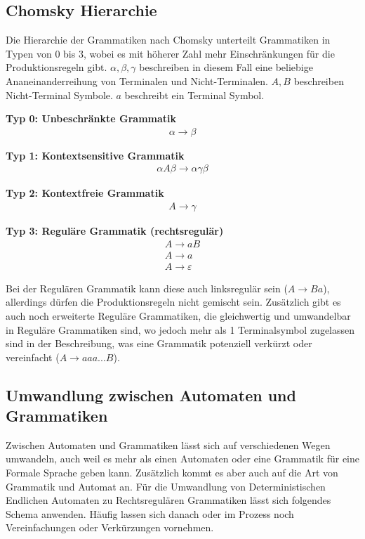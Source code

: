 \subsection{Chomsky Hierarchie}

Die Hierarchie der Grammatiken nach Chomsky unterteilt Grammatiken in Typen von 0
bis 3, wobei es mit höherer Zahl mehr Einschränkungen für die Produktionsregeln gibt.
$\alpha, \beta, \gamma$ beschreiben in diesem Fall eine beliebige Ananeinanderreihung
von Terminalen und Nicht-Terminalen.
$A, B$ beschreiben Nicht-Terminal Symbole.
$a$ beschreibt ein Terminal Symbol.

\textbf{Typ 0: Unbeschränkte Grammatik}
\Large
\begin{align*}
    \alpha \rightarrow \beta
\end{align*}
\normalsize

\textbf{Typ 1: Kontextsensitive Grammatik}
\Large
\begin{align*}
    \alpha A \beta \rightarrow \alpha \gamma \beta
\end{align*}
\normalsize

\textbf{Typ 2: Kontextfreie Grammatik}
\Large
\begin{align*}
    A \rightarrow \gamma
\end{align*}
\normalsize

\textbf{Typ 3: Reguläre Grammatik (rechtsregulär)}
\Large
\begin{align*}
    A \rightarrow aB \\
    A \rightarrow a \\
    A \rightarrow \varepsilon
\end{align*}
\normalsize

Bei der Regulären Grammatik kann diese auch linksregulär sein ($A \rightarrow Ba$),
allerdings dürfen die Produktionsregeln nicht gemischt sein.
Zusätzlich gibt es auch noch erweiterte Reguläre Grammatiken, die gleichwertig und
umwandelbar in Reguläre Grammatiken sind, wo jedoch mehr als 1 Terminalsymbol zugelassen
sind in der Beschreibung, was eine Grammatik potenziell verkürzt oder vereinfacht
($A \rightarrow aaa...B$).

\clearpage

\subsection{Umwandlung zwischen Automaten und Grammatiken}

Zwischen Automaten und Grammatiken lässt sich auf verschiedenen Wegen umwandeln,
auch weil es mehr als einen Automaten oder eine Grammatik für eine Formale Sprache
geben kann. Zusätzlich kommt es aber auch auf die Art von Grammatik und Automat an.
Für die Umwandlung von Deterministischen Endlichen Automaten zu Rechtsregulären Grammatiken
lässt sich folgendes Schema anwenden.
Häufig lassen sich danach oder im Prozess noch Vereinfachungen oder Verkürzungen vornehmen. 

